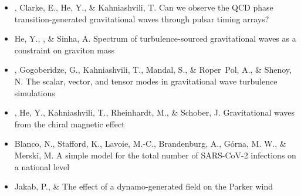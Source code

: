 \begin{itemize}
\item[{419.}~]
\Brandenburg, Clarke, E., He, Y., \& Kahniashvili, T.
{Can we observe the QCD phase transition-generated gravitational waves through pulsar timing arrays?}

\item[{418.}~]
He, Y., \Brandenburg, \& Sinha, A.
{Spectrum of turbulence-sourced gravitational waves as a constraint on graviton mass}

\item[{417.}~]
\Brandenburg, Gogoberidze, G., Kahniashvili, T., Mandal, S., \& Roper~Pol, A., \& Shenoy, N.
{The scalar, vector, and tensor modes in gravitational wave turbulence simulations}

\item[{416.}~]
\Brandenburg, He, Y., Kahniashvili, T., Rheinhardt, M., \& Schober, J.
{Gravitational waves from the chiral magnetic effect}

\item[{415.}~]
Blanco, N., Stafford, K., Lavoie, M.-C., Brandenburg, A., G{\'o}rna, M. W., \& Merski, M.
{A simple model for the total number of SARS-CoV-2 infections on a national level}

\item[{414.}~]
Jakab, P., \& \Brandenburg{}
{The effect of a dynamo-generated field on the Parker wind}


\end{itemize}
